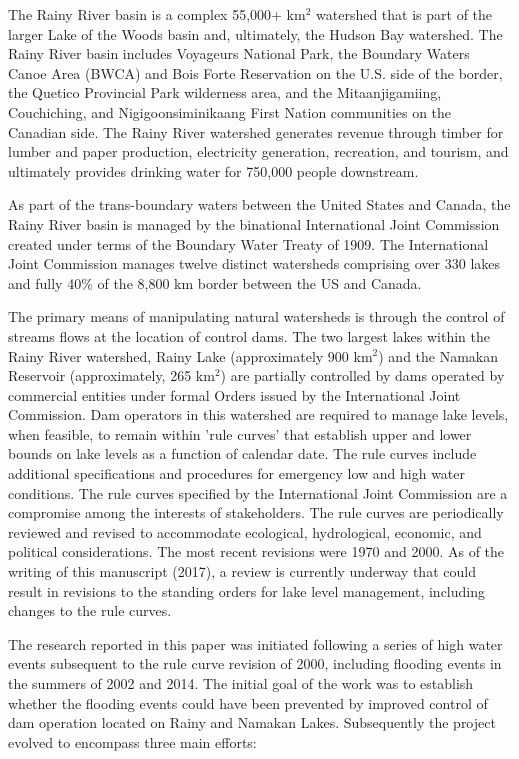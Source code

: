 \documentclass[preprint,times]{elsarticle}
\begin{document}
The Rainy River basin is a complex 55,000+ km$^2$ watershed that is part of the larger Lake of the Woods basin and, ultimately, the Hudson Bay watershed. The Rainy River basin includes Voyageurs National Park, the Boundary Waters Canoe Area (BWCA) and Bois Forte Reservation on the U.S. side of the border, the Quetico Provincial Park wilderness area, and the Mitaanjigamiing, Couchiching, and Nigigoonsiminikaang First Nation communities on the Canadian side. The Rainy River watershed generates revenue through timber for lumber and paper production, electricity generation, recreation, and tourism, and ultimately provides drinking water for 750,000 people downstream.

As part of the trans-boundary waters between the United States and Canada, the Rainy River basin is managed by the binational International Joint Commission created under terms of the Boundary Water Treaty of 1909. The International Joint Commission manages twelve distinct watersheds comprising over 330 lakes and fully 40\% of the 8,800 km border between the US and Canada. 

The primary means of manipulating natural watersheds is through the control of streams flows at the location of control dams. The two largest lakes within the Rainy River watershed, Rainy Lake (approximately 900 km$^2$) and the Namakan Reservoir (approximately, 265 km$^2$) are partially controlled by dams operated by commercial entities under formal Orders issued by the International Joint Commission. Dam operators in this watershed are required to manage lake levels, when feasible, to remain within 'rule curves' that establish upper and lower bounds on lake levels as a function of calendar date. The rule curves include additional specifications and procedures for emergency low and high water conditions. The rule curves specified by the International Joint Commission are a compromise among the interests of stakeholders. The rule curves are periodically reviewed and revised to accommodate ecological, hydrological, economic, and political considerations. The most recent revisions were 1970 and 2000. As of the writing of this manuscript (2017), a review is currently underway that could result in revisions to the standing orders for lake level management, including changes to the rule curves.

The research reported in this paper was initiated following a series of high water events subsequent to the rule curve revision of 2000, including flooding events in the summers of 2002 and 2014. The initial goal of the work was to establish whether the flooding events could have been prevented by improved control of dam operation located on Rainy and Namakan Lakes. Subsequently the project evolved to encompass three main efforts:
\end{document}

